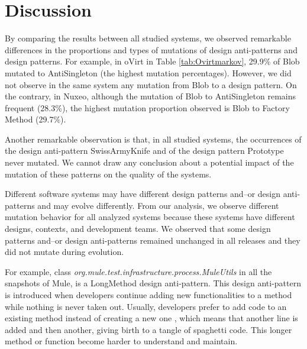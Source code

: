 \section{Discussion}
\label{sec:Discussion}

By comparing the results between all studied systems, we observed remarkable differences in the proportions and types of mutations of design anti-patterns and design patterns. For example, in oVirt in Table \ref{tab:Ovirtmarkov}, 29.9\% of Blob mutated to AntiSingleton (the highest mutation percentages). However, we did not observe in the same system any mutation from Blob to a design pattern. On the contrary, in Nuxeo, although the mutation of Blob to AntiSingleton remains frequent (28.3\%), the highest mutation proportion observed is Blob to Factory Method (29.7\%).

Another remarkable observation is that, in all studied systems, the occurrences of the design anti-pattern SwissArmyKnife and of the design pattern Prototype never mutated. We cannot draw any conclusion about a potential impact of the mutation of these patterns on the quality of the systems. 


Different software systems may have different design patterns and--or design anti-patterns and may evolve differently. From our analysis, we observe different mutation behavior for all analyzed systems because these systems have different designs, contexts, and development teams. We observed that some design patterns and--or design anti-patterns remained unchanged in all releases and they did not mutate during evolution. 

For example, class \emph{org.mule.test.infrastructure.process.MuleUtils} in all the snapshots of Mule, is a LongMethod design anti-pattern. This design anti-pattern is introduced when developers continue adding new functionalities to a method while nothing is never taken out. Usually, developers prefer to add code to an existing method instead of creating a new one \cite{brown1998antipatterns}, which means that another line is added and then another, giving birth to a tangle of spaghetti code. This longer method or function become harder to understand and maintain.

